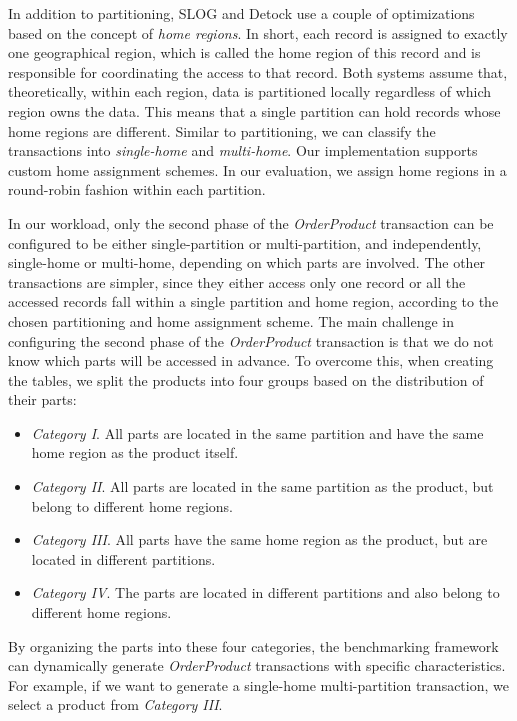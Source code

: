 \documentclass{article}
\begin{document}
In addition to partitioning, SLOG and Detock use a couple of optimizations based on the concept of \textit{home regions}. In short, each record is assigned to exactly one geographical region, which is called the home region of this record and is responsible for coordinating the access to that record. Both systems assume that, theoretically, within each region, data is partitioned locally regardless of which region owns the data. This means that a single partition can hold records whose home regions are different. Similar to partitioning, we can classify the transactions into \textit{single-home} and \textit{multi-home}. Our implementation supports custom home assignment schemes. In our evaluation, we assign home regions in a round-robin fashion within each partition.

In our workload, only the second phase of the \textit{OrderProduct} transaction can be configured to be either single-partition or multi-partition, and independently, single-home or multi-home, depending on which parts are involved. The other transactions are simpler, since they either access only one record or all the accessed records fall within a single partition and home region, according to the chosen partitioning and home assignment scheme. The main challenge in configuring the second phase of the \textit{OrderProduct} transaction is that we do not know which parts will be accessed in advance. To overcome this, when creating the tables, we split the products into four groups based on the distribution of their parts:
\begin{itemize}
    \item \textit{Category I}. All parts are located in the same partition and have the same home region as the product itself.
    \item \textit{Category II}. All parts are located in the same partition as the product, but belong to different home regions.
    \item \textit{Category III}. All parts have the same home region as the product, but are located in different partitions.
    \item \textit{Category IV}. The parts are located in different partitions and also belong to different home regions.
\end{itemize}

By organizing the parts into these four categories, the benchmarking framework can dynamically generate \textit{OrderProduct} transactions with specific characteristics. For example, if we want to generate a single-home multi-partition transaction, we select a product from \textit{Category III}.
\end{document}
